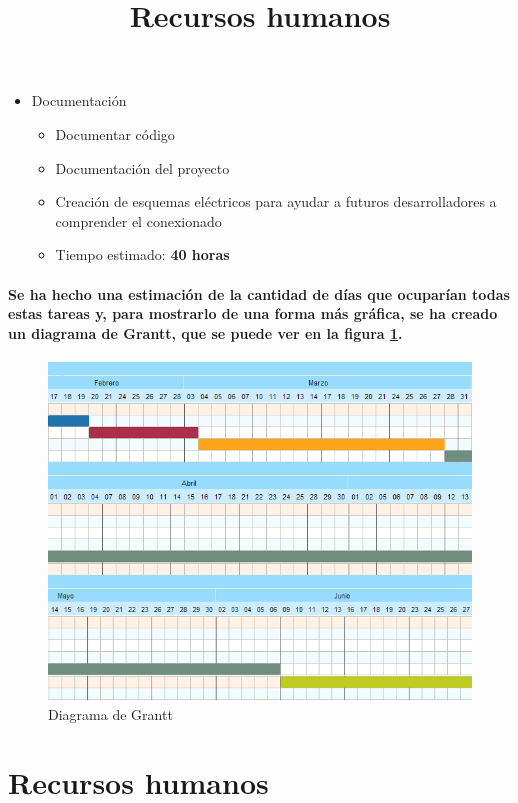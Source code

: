 \begin{itemize}
  \item Documentación
  \begin{itemize}
    \item{Documentar código}
    \item{Documentación del proyecto}
    \item{Creación de esquemas eléctricos para ayudar a futuros desarrolladores
    a comprender el conexionado}
    \item{Tiempo estimado: \textbf{40 horas}}
  \end{itemize}
\end{itemize}

\paragraph{
Se ha hecho una estimación de la cantidad de días que ocuparían todas
estas tareas y, para mostrarlo de una forma más gráfica,
se ha creado un diagrama de Grantt, que se puede ver en la figura \ref{fig:grantt}.
}

\begin{figure}[htb]
\centering
\includegraphics[width=1\textwidth]{./imagenes/grantt}
\caption{Diagrama de Grantt} \label{fig:grantt}
\end{figure}


\title{Recursos humanos}
\section{Recursos humanos}

